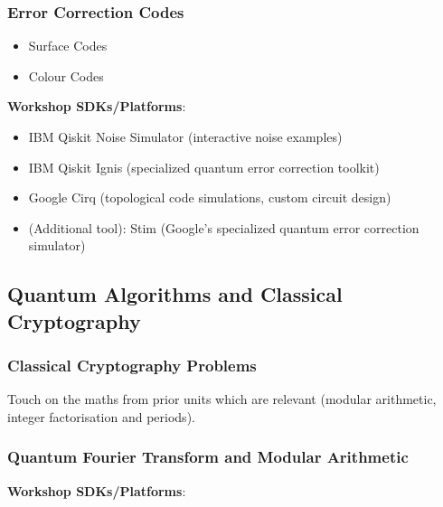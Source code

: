 \subsubsection{Error Correction Codes}
	
\begin{itemize}
	\item Surface Codes
	\item Colour Codes
\end{itemize}

\textbf{Workshop SDKs/Platforms}:

\begin{itemize}
	\item IBM Qiskit Noise Simulator (interactive noise examples)
	\item IBM Qiskit Ignis (specialized quantum error correction toolkit)
	\item Google Cirq (topological code simulations, custom circuit design)
	\item (Additional tool): Stim (Google's specialized quantum error correction simulator)
\end{itemize}


\subsection{Quantum Algorithms and Classical Cryptography}


\subsubsection{Classical Cryptography Problems}

Touch on the maths from prior units which are relevant (modular arithmetic, integer factorisation and periods).


\subsubsection{Quantum Fourier Transform and Modular Arithmetic}

\textbf{Workshop SDKs/Platforms}:

